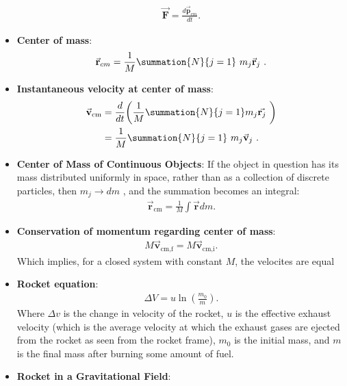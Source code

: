 \documentclass{report}
\begin{document}
\begin{itemize}
\begin{align*}
                \vec{\mathbf{F}} = \frac{d \vec{\mathbf{p}}_{cm}}{dt}
            .\end{align*}
            \bigbreak \noindent 
        \item \textbf{Center of mass}:
            \begin{align*}
                \vec{\mathbf{r}}_{cm} = \frac{1}{M}\summation{N}{j=1}\ m_{j}\vec{\mathbf{r}}_{j} \
            .\end{align*}
        \item \textbf{Instantaneous velocity at center of mass}:
            \begin{align*}
                \vec{\mathbf{v}}_{\text{cm}} &= \frac{d}{dt}\bigg(\frac{1}{M}\summation{N}{j=1}m_{j}\vec{\mathbf{r}_{j}}\ \bigg) \\
                    &=\frac{1}{M}\summation{N}{j=1}\ m_{j}\vec{\mathbf{v}}_{j}\
            .\end{align*}
        \item \textbf{Center of Mass of Continuous Objects}:
            If the object in question has its mass distributed uniformly in space, rather than as a collection of discrete particles, then  $m_{j} \rightarrow dm $ , and the summation becomes an integral:
            \begin{align*}
                \vec{\mathbf{r}}_{\text{cm}} = \frac{1}{M}\int \vec{\mathbf{r}}dm
            .\end{align*}
        \item \textbf{Conservation of momentum regarding center of mass}:
            \begin{align*}
                M\vec{\mathbf{v}}_{\text{cm,f}} = M\vec{\mathbf{v}}_{\text{cm,i}}
            .\end{align*}
            Which implies, for a closed system with constant $M$, the velocites are equal 
        \item \textbf{Rocket equation}:
            \begin{align*}
                \Delta V = u\ln{\left(\frac{m_{0}}{m}\right)}
            .\end{align*}
            Where $\Delta v$ is the change in velocity of the rocket, $u$ is the effective exhaust velocity (which is the average velocity at which the exhaust gases are ejected from the rocket as seen from the rocket frame), $m_{0}$ is the initial mass, and $m$ is the final mass after burning some amount of fuel.
        \item \textbf{Rocket in a Gravitational Field}:
            \begin{align*}

\end{align*}
\end{itemize}
\end{document}
